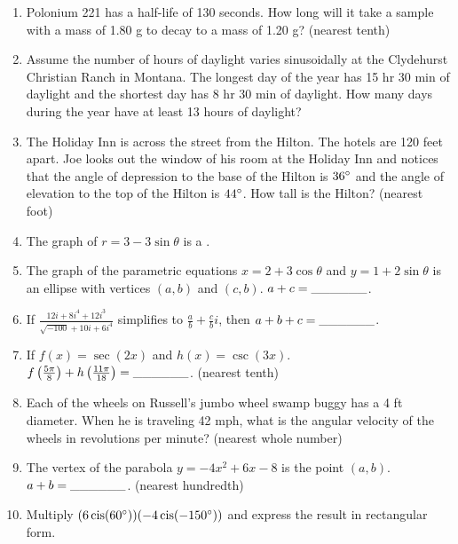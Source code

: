 \documentclass[../uilmath.tex]{subfiles}
\begin{document}
\begin{enumerate}[label=\bfseries\arabic*.]
    \item %
    Polonium 221 has a half-life of 130 seconds. How long will it take a sample with a mass of 1.80 g to decay to a mass of 1.20 g? (nearest tenth)

    \item %
    Assume the number of hours of daylight varies sinusoidally at the Clydehurst Christian Ranch in Montana. The longest day of the year has 15 hr 30 min of daylight and the 
    shortest day has 8 hr 30 min of daylight. How many days during the year have at least 13 hours of daylight?

    \item %
    The Holiday Inn is across the street from the Hilton. The hotels are 120 feet apart. Joe looks out the window of his room 
    at the Holiday Inn and notices that the angle of depression to the base of the Hilton is $36\degree$ and the angle of elevation 
    to the top of the Hilton is $44\degree$. How tall is the Hilton? (nearest foot)

    \item %
    The graph of $r=3-3\sin\theta$ is a \blank.

    \item %
    The graph of the parametric equations $x=2+3\cos\theta$ and $y=1+2\sin\theta$ is an ellipse with vertices 
    $(a,b)$ and $(c,b)$. $a+c=\_\_\_\_\_\_$.

    \item %
    If $\frac{12i+8i^4+12i^3}{\sqrt{-100}+10i+6i^4}$ simplifies to $\frac{a}{b}+\frac{c}{b}i$, then $a+b+c=\_\_\_\_\_\_$.

    \item %
    If $f(x)=\sec(2x)$ and $h(x)=\csc(3x)$. $f\left(\frac{5\pi}{8}\right)+h\left(\frac{11\pi}{18}\right)=\_\_\_\_\_\_$. (nearest tenth)

    \item %
    Each of the wheels on Russell's jumbo wheel swamp buggy has a 4 ft diameter. When he is traveling 42 mph, what 
    is the angular velocity of the wheels in revolutions per minute? (nearest whole number)

    \item %
    The vertex of the parabola $y=-4x^2+6x-8$ is the point $(a,b)$. $a+b=\_\_\_\_\_\_$. (nearest hundredth)

    \item %
    Multiply $(6\operatorname{cis}(60\degree))(-4\operatorname{cis}(-150\degree))$ and express the result in rectangular form.


\end{enumerate}
\end{document}
